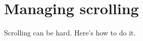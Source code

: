 \chapter{Managing scrolling}\label{chapscrolling}
%
%
\setfooter{\thepage}{}{}{}{}{\thepage}%

Scrolling can be hard. Here's how to do it.

